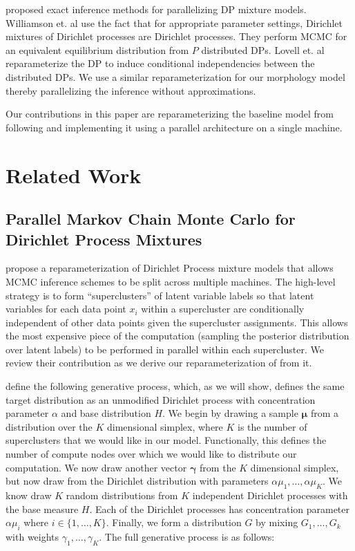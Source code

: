 \documentclass{article}
\begin{document}
\cite{lovell2012,williamsonparallel} proposed exact inference methods
for parallelizing DP mixture models. Williamson et. al \cite{williamsonparallel}
 use the fact that for appropriate parameter settings, Dirichlet mixtures of
Dirichlet processes are Dirichlet processes. They perform MCMC for an equivalent
equilibrium distribution from $P$ distributed DPs. Lovell et. al \cite{lovell2012}
 reparameterize the DP to induce conditional independencies between the 
distributed DPs. We use a similar reparameterization for our morphology
model thereby parallelizing the inference without approximations.

Our contributions in this paper are reparameterizing the baseline model
 from \cite{goldwater2011} following \cite{lovell2012} and 
implementing it using a parallel architecture on a single machine.

\section{Related Work}
\label{sec:related-work}

\subsection{Parallel Markov Chain Monte Carlo for Dirichlet Process Mixtures}
\label{sec:parallel-mcmc-for-dpm}

\cite{lovell2012} propose a reparameterization of Dirichlet Process
mixture models that allows MCMC inference schemes to be split across
multiple machines. The high-level strategy is to form
``superclusters'' of latent variable labels so that latent variables
for each data point $x_i$ within a supercluster are conditionally
independent of other data points given the supercluster
assignments. This allows the most expensive piece of the computation
(sampling the posterior distribution over latent labels) to be
performed in parallel within each supercluster. We review their
contribution as we derive our reparameterization of
\cite{goldwater2011} from it.

\cite{lovell2012} define the following generative process, which, as
we will show, defines the same target distribution as an unmodified
Dirichlet process with concentration parameter $\alpha$ and base
distribution $H$. We begin by drawing a sample $\boldsymbol{\mu}$ from
a distribution over the $K$ dimensional simplex, where $K$ is the
number of superclusters that we would like in our model. Functionally,
this defines the number of compute nodes over which we would like to
distribute our computation. We now draw another vector
$\boldsymbol{\gamma}$ from the $K$ dimensional simplex, but now draw
from the Dirichlet distribution with parameters $\alpha \mu_1, \ldots,
\alpha \mu_K$. We know draw $K$ random distributions from $K$
independent Dirichlet processes with the base measure $H$. Each of the
Dirichlet processes has concentration parameter $\alpha \mu_i$ where
$i \in \{1, \ldots, K\}$. Finally, we form a distribution $G$ by
mixing $G_1, \ldots, G_k$ with weights $\gamma_1, \ldots,
\gamma_K$. The full generative process is as follows:
\end{document}

